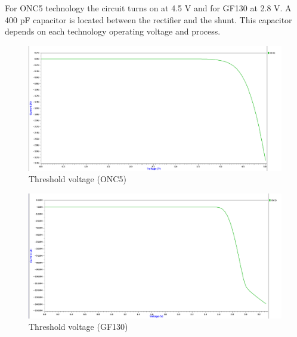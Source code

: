 \documentclass{article} %
\begin{document}
\begin{multicols}{2}
For ONC5 technology the circuit turns on at 4.5 V and for GF130 at 2.8 V. A 400 pF capacitor is located between the rectifier and the shunt. This capacitor depends on each technology operating voltage and process.
\begin{figure}[H]
\centering
\includegraphics[width=0.9\linewidth]{Images/ImagenesTesina/simulaciones/shunt_500.png}
\caption{Threshold voltage (ONC5)}
\label{fig:shunt_500}
\end{figure}

\begin{figure}[H]
\centering
\includegraphics[width=0.9\linewidth]{Images/ImagenesTesina/simulaciones/shunt_130.png}
\caption{Threshold voltage (GF130)}
\label{fig:shunt_130}
\end{figure}


\end{multicols}
\end{document}
